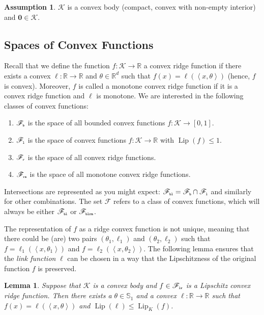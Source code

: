 \documentclass[letter, 12pt]{report}
\newcommand{\pr}{\text{\tiny\texttt{r}}}
\newcommand{\pb}{\text{\tiny\texttt{b}}}
\newcommand{\pl}{\text{\tiny\texttt{l}}}
\renewcommand{\pm}{\text{\tiny\texttt{m}}}
\newcommand{\R}{\mathbb R}
\newcommand{\ip}[1]{\left \langle #1 \right \rangle}
\newcommand{\sphere}{\mathbb{S}}
\newcommand{\cK}{\mathcal K}
\newcommand{\sF}{\mathscr F}
\newcommand{\zeros}{ \bm 0}
\newcommand{\lip}{\operatorname{Lip}}
\newcommand{\1}{\mathbf{1}}
\theoremstyle{plain}
\newtheorem{lemma}[theorem]{Lemma}
\theoremstyle{definition}
\newtheorem{assumption}[theorem]{Assumption}
\theoremstyle{remark}
\begin{document}
\begin{assumption}
    $\cK$ is a convex body (compact, convex with non-empty interior) and $\zeros \in \cK$.
\end{assumption}

\subsection{Spaces of Convex Functions}
Recall that we define the function $f : \cK \to \R$ a convex ridge function if there exists a convex $\ell : \R \to \R$ and $\theta \in \R^d$ such that $f(x) = \ell(\ip{x, \theta})$ (hence, $f$ is convex).
Moreover, $f$ is called a monotone convex ridge function if it is a convex ridge function and $\ell$ is
monotone.
We are interested in the following classes of convex functions:
\begin{enumerate}
    \item $\sF_{\pb}$ is the space of all bounded convex functions $f : \cK \to [0,1]$.
    \item $\sF_{\pl}$ is the space of convex functions $f : \cK \to \R$ with $\lip(f) \leq 1$.
    \item $\sF_{\pr}$ is the space of all convex ridge functions.
    \item $\sF_{\pr\pm}$ is the space of all monotone convex ridge functions.
\end{enumerate}
Intersections are represented as you might expect: $\sF_{\pb\pl} = \sF_{\pb} \cap \sF_{\pl}$ and similarly for other combinations.
The set $\sF$ refers to a class of convex functions, which will always be either $\sF_{\pb\pl}$ or $\sF_{\pb\pl\pr\pm}$.

The representation of $f$ as a ridge convex function is not unique,
meaning that there could be (are) two pairs $(\theta_1, \ell_1)$ and $(\theta_2, \ell_2)$ such that
$f = \ell_1(\ip{x, \theta_1})$ and $f = \ell_2(\ip{x, \theta_2})$.
The following lemma ensures that the \textit{link function} $\ell$ can be chosen
in a way that the Lipschitzness of the original function $f$ is preserved.
\begin{lemma}\label{lem:lip}
    Suppose that $\cK$ is a convex body and $f \in \sF_{\pl\pr}$ is a Lipschitz convex ridge function.
    Then there exists a $\theta \in \sphere_1$ and a convex $\ell : \R \to \R$
    such that $f(x) = \ell(\ip{x, \theta})$ and $\lip(\ell) \leq \lip_K(f)$.
\end{lemma}
\end{document}
